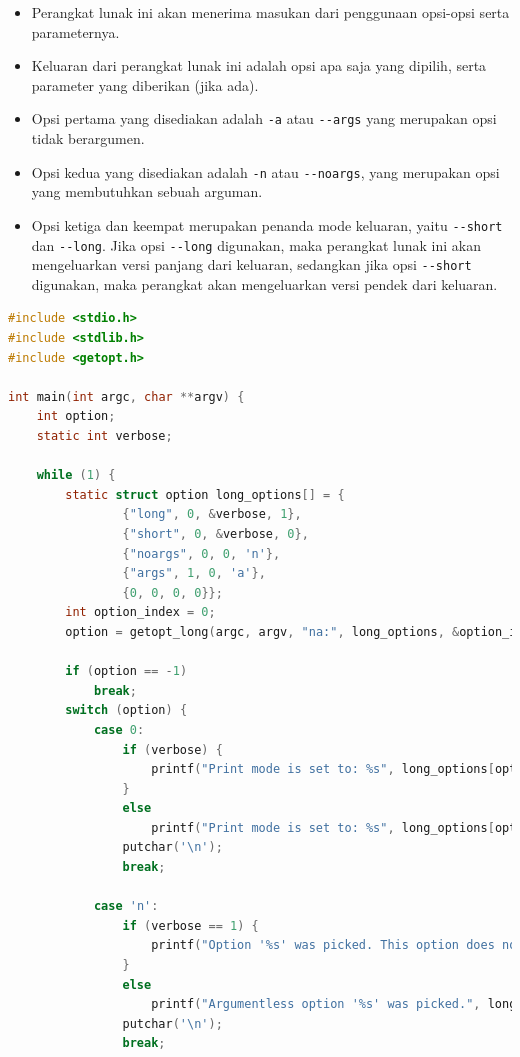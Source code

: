\documentclass[a4paper,twoside]{article}
\begin{document}
\begin{enumerate}
\begin{itemize}
	\item Perangkat lunak ini akan menerima masukan dari penggunaan opsi-opsi serta parameternya.
	\item Keluaran dari perangkat lunak ini adalah opsi apa saja yang dipilih, serta parameter yang \linebreak diberikan (jika ada).
	\item Opsi pertama yang disediakan adalah \verb|-a| atau \verb|--args| yang merupakan opsi tidak berargumen.
	\item Opsi kedua yang disediakan adalah \verb|-n| atau \verb|--noargs|, yang merupakan opsi yang membutuhkan sebuah arguman.
	\item Opsi ketiga dan keempat merupakan penanda mode keluaran, yaitu \verb|--short| dan \verb|--long|. Jika opsi \verb|--long| digunakan, maka perangkat lunak ini akan mengeluarkan versi panjang dari keluaran, sedangkan jika opsi \verb|--short| digunakan, maka perangkat akan mengeluarkan versi pendek dari keluaran.
\end{itemize}

\begin{lstlisting}[language=C, caption=Contoh sederhana penggunaan getopt-long, label=code:getopt-usage-long]
#include <stdio.h>
#include <stdlib.h>
#include <getopt.h>

int main(int argc, char **argv) {
    int option;
    static int verbose;

    while (1) {
        static struct option long_options[] = {
                {"long", 0, &verbose, 1},
                {"short", 0, &verbose, 0},
                {"noargs", 0, 0, 'n'},
                {"args", 1, 0, 'a'},
                {0, 0, 0, 0}};
        int option_index = 0;
        option = getopt_long(argc, argv, "na:", long_options, &option_index);

        if (option == -1)
            break;
        switch (option) {
	        case 0:
    	        if (verbose) {
	                printf("Print mode is set to: %s", long_options[option_index].name);
	            }
	            else
	                printf("Print mode is set to: %s", long_options[option_index].name);
	            putchar('\n');
	            break;

    	    case 'n':
	            if (verbose == 1) {
	                printf("Option '%s' was picked. This option does not require any arguments.", long_options[option_index].name);
    	        }
	            else
	                printf("Argumentless option '%s' was picked.", long_options[option_index].name);
	            putchar('\n');
	            break;


\end{lstlisting}
\end{enumerate}
\end{document}
